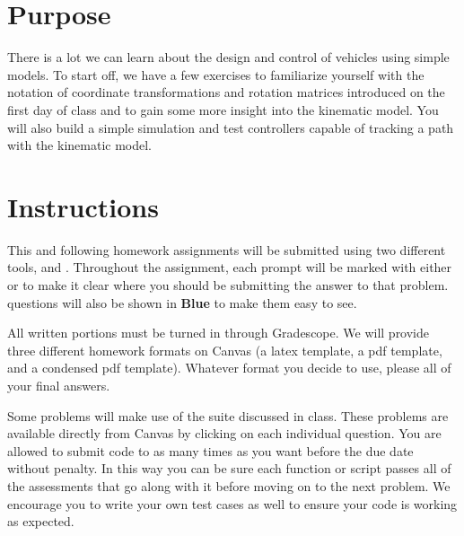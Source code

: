 
\hspace{0.5cm}

\section*{Purpose}

There is a lot we can learn about the design and control of vehicles using simple models. To start off, we have a few exercises to familiarize yourself with the notation of coordinate transformations and rotation matrices introduced on the first day of class and to gain some more insight into the kinematic model. You will also build a simple simulation and test controllers capable of tracking a path with the kinematic model.



\section*{Instructions}

This and following homework assignments will be submitted using two different tools, \GSno{} and \GRno{}.
Throughout the assignment, each prompt will be marked with either \GS{} or \GR{} to make it clear
where you should be submitting the answer to that problem. \GRno{} questions will also be shown in
\textbf{\color{blue}Blue} to make them easy to see.

All written portions must be turned in through Gradescope. We will provide three different homework formats on Canvas (a latex template, a pdf template, and a condensed pdf template). Whatever format you decide to use, please  all of your final answers.

Some problems will make use of the \GRno{} suite discussed in class. These problems are available directly from Canvas
by clicking on each individual question.
You are allowed to submit code to \GRno{} as many times as you want before the due date without penalty. In this
way you can be sure each function or script passes all of the assessments that go along with it before moving on to the
next problem. We encourage you to write
your own test cases as well to ensure your code is working as expected. 


\newpage
